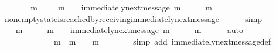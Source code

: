 \begin{isabellebody}
\ \ \isamarkupfalse%
\ \isamarkupfalse%
\ {\isachardoublequoteopen}{\isasymexists}\ {\isasymsigma}{\isacharprime}{\isacharprime}\ m{\isachardot}\ {\isasymsigma}{\isacharprime}{\isacharprime}\ {\isasymin}\ {\isasymSigma}\ {\isasymand}\ m\ {\isasymin}\ {\isasymsigma}{\isacharprime}\ {\isasymand}\ immediately{\isacharunderscore}next{\isacharunderscore}message{\isacharparenleft}{\isasymsigma}{\isacharprime}{\isacharprime}{\isacharcomma}\ m{\isacharparenright}\ {\isasymand}\ {\isasymsigma}{\isacharprime}\ {\isacharequal}\ {\isasymsigma}{\isacharprime}{\isacharprime}\ {\isasymunion}\ {\isacharbraceleft}m{\isacharbraceright}{\isachardoublequoteclose}\isanewline
\ \ \ \ \isamarkupfalse%
\ non{\isacharunderscore}empty{\isacharunderscore}state{\isacharunderscore}is{\isacharunderscore}reached{\isacharunderscore}by{\isacharunderscore}receiving{\isacharunderscore}immediately{\isacharunderscore}next{\isacharunderscore}message\isanewline
\ \ \ \ \isamarkupfalse%
\ simp\ \ \ \ \isanewline
\ \ \isamarkupfalse%
\ \isamarkupfalse%
\ {\isasymsigma}{\isacharprime}{\isacharprime}\ m\ \ {\isachardoublequoteopen}{\isasymsigma}{\isacharprime}{\isacharprime}\ {\isasymin}\ {\isasymSigma}\ {\isasymand}\ m\ {\isasymin}\ {\isasymsigma}{\isacharprime}\ {\isasymand}\ immediately{\isacharunderscore}next{\isacharunderscore}message{\isacharparenleft}{\isasymsigma}{\isacharprime}{\isacharprime}{\isacharcomma}\ m{\isacharparenright}\ {\isasymand}\ {\isasymsigma}{\isacharprime}\ {\isacharequal}\ {\isasymsigma}{\isacharprime}{\isacharprime}\ {\isasymunion}\ {\isacharbraceleft}m{\isacharbraceright}{\isachardoublequoteclose}\isanewline
\ \ \ \ \isamarkupfalse%
\ auto\isanewline
\ \ \isamarkupfalse%
\ \isamarkupfalse%
\ {\isachardoublequoteopen}{\isasymsigma}\ {\isasymsubset}\ {\isasymsigma}{\isacharprime}\ {\isasymand}\ {\isasymsigma}{\isacharprime}\ {\isasymnoteq}\ {\isasymemptyset}\ {\isasymand}\ {\isasymsigma}{\isacharprime}\ {\isacharequal}\ {\isasymsigma}{\isacharprime}{\isacharprime}\ {\isasymunion}\ {\isacharbraceleft}m{\isacharbraceright}\ {\isasymand}\ m\ {\isasymin}\ {\isasymsigma}{\isacharprime}\ {\isasymand}\ m\ {\isasymnotin}\ {\isasymsigma}{\isacharprime}{\isacharprime}{\isachardoublequoteclose}\isanewline
\ \ \ \ \isamarkupfalse%
\ {\isacharparenleft}simp\ add{\isacharcolon}\ immediately{\isacharunderscore}next{\isacharunderscore}message{\isacharunderscore}def{\isacharparenright}\isanewline
\ \ \ \ \isamarkupfalse%

\end{isabellebody}
